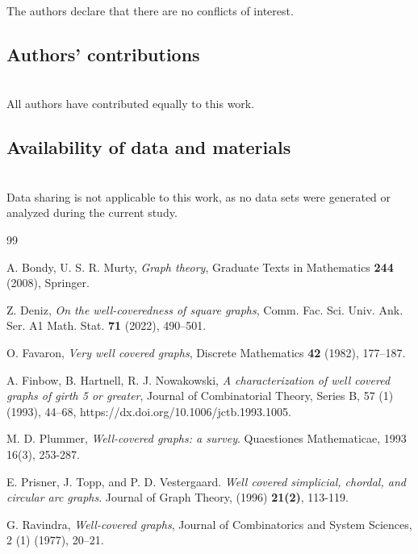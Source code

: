 \documentclass[12pt]{amsart}
\numberwithin{equation}{section}
\theoremstyle{definition}
\begin{document}
  \noindent The authors declare that there are no conflicts of interest.
  
  
  \subsection*{\bf Authors' contributions}\ \\[-0.3cm]
  
  \noindent All authors have contributed equally to this work.
  
  
  
   
  
  \subsection*{\bf Availability of data and materials}\ \\[-0.3cm]
  
  \noindent Data sharing is not applicable to this work, as no data sets were generated or analyzed during the current study.
  
    
    
\begin{thebibliography}{99}

 A. Bondy, U. S. R. Murty, \textit{Graph theory}, Graduate Texts in Mathematics {\bf 244}  (2008), Springer.
 
Z. Deniz,
\emph{On the well-coveredness of square graphs},
Comm. Fac. Sci. Univ. Ank. Ser. A1 Math. Stat. {\bf 71} (2022), 490--501.

 O. Favaron, \textit{Very well covered graphs}, Discrete Mathematics {\bf 42} (1982), 177--187.

 A. Finbow, B. Hartnell, R. J. Nowakowski, \emph{A characterization of well covered graphs of girth 5 or greater}, Journal of Combinatorial Theory, Series B, 57 (1) (1993), 44–68,
https://dx.doi.org/10.1006/jctb.1993.1005.

 

 M. D. Plummer, \emph{Well-covered graphs: a survey}. Quaestiones Mathematicae, 1993 16(3), 253-287.
 

  E. Prisner, J. Topp, and P. D. Vestergaard. \emph{Well covered simplicial, chordal, and circular arc graphs}. Journal of Graph Theory, (1996) {\bf 21(2)}, 113-119.

 G. Ravindra, \emph{Well-covered graphs}, Journal of Combinatorics and System Sciences, 2 (1) (1977), 20–21.

\end{thebibliography}
 
\end{document}
